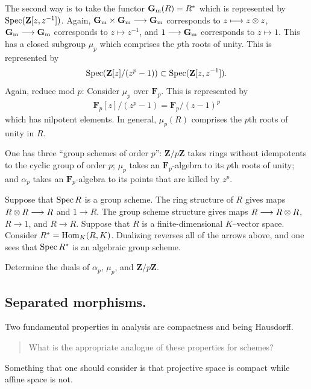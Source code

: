 \documentclass [11 pt, oneside] {article}
\begin{document}
The second way is to take the functor $\mathbf{G}\textsubscript{m}(R)=R^*$ which is represented by $\operatorname{Spec} (\mathbf{Z}[z,z^{-1}])$. Again, $\mathbf{G}\textsubscript{m}\times \mathbf{G}\textsubscript{m}\longrightarrow \mathbf{G}\textsubscript{m}$ corresponds to $z\longmapsto z\otimes z$, $\mathbf{G}\textsubscript{m}\longrightarrow \mathbf{G}\textsubscript{m}$ corresponds to $z\longmapsto z^{-1}$, and $1\longrightarrow \mathbf{G}\textsubscript{m}$ corresponds to $z\longmapsto 1$.
This has a closed subgroup $\mu_p$ which comprises the $p$th roots of unity. This is represented by
\begin{align*}
	\operatorname{Spec} (\mathbf{Z}[z]/(z^p-1)) \subset \operatorname{Spec} (\mathbf{Z}[z,z^{-1}]).
\end{align*}
Again, reduce mod $p$: Consider $\mu_p$ over $\mathbf{F}_{p}$. This is represented by
\begin{align*}
	\mathbf{F}_{p}[z]/(z^p-1) =  \mathbf{F}_{p}/(z-1) ^p
\end{align*}
which has nilpotent elements. 
In general, $\mu_p(R)$ comprises the $p$th roots of unity in $R$.

One has three ``group schemes of order $p$'': $\mathbf{Z}/p\mathbf{Z}$ takes rings without idempotents to the cyclic group of order $p$; $\mu_p$ takes an $\mathbf{F}_{p}$-algebra to its $p$th roots of unity; and $\alpha_p$ takes an $\mathbf{F}_{p}$-algebra to its points that are killed by $z^p$.

\begin{exercise}\label{cduality}\text{}
Suppose that $\operatorname{Spec} R$ is a group scheme. The ring structure of $R$ gives maps $R\otimes R\longrightarrow R$ and $1\longrightarrow R$. The group scheme structure gives maps $R\longrightarrow R\otimes R$, $R\longrightarrow 1$, and $R\longrightarrow R$. 
Suppose that $R$ is a finite-dimensional $K$--vector space. Consider $R^* = \operatorname{Hom}_{K}(R, K)$. Dualizing reverses all of the arrows above, and one sees that $\operatorname{Spec} R^*$ is an algebraic group scheme.

Determine the duals of $\alpha_p$, $\mu_p$, and $\mathbf{Z}/p\mathbf{Z}$.
\end{exercise}

\subsection{Separated morphisms.}
Two fundamental properties in analysis are compactness and being Hausdorff. 
\begin{quote}
	\small What is the appropriate analogue of these properties for schemes?
\end{quote}
Something that one should consider is that projective space is compact while affine space is not.
\end{document}
